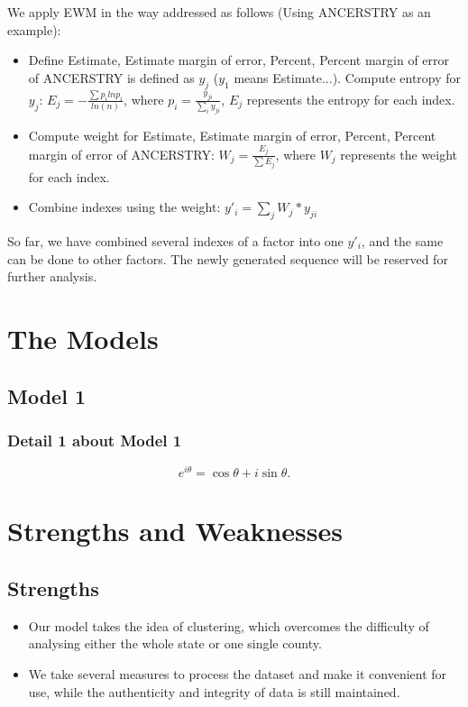 \documentclass[12pt]{article}
\begin{document}
We apply EWM in the way addressed as follows (Using ANCERSTRY as an example):
\begin{itemize}
	\item Define Estimate, Estimate margin of error, Percent, Percent margin of error of ANCERSTRY is defined as $y_{j}$ ($y_{1}$ means Estimate...). Compute entropy for $y_{j}$: $ E_{j} = -\frac{\sum p_{i}lnp_{i}}{ln(n)}$, where $p_{i}=\frac{y_{ji}}{\sum_{i} y_{ji}}$, $E_{j}$ represents the entropy for each index.
	\item Compute weight for Estimate, Estimate margin of error, Percent, Percent margin of error of ANCERSTRY: $ W_{j} = \frac{E_{j}}{\sum E_{j}}$, where $W_{j}$ represents the weight for each index.
	\item Combine indexes using the weight: $y'_{i} = \sum_{j} W_{j} * y_{ji}$
\end{itemize}
So far, we have combined several indexes of a factor into one $y'_{i}$, and the same can be done to other factors. The newly generated sequence will be reserved for further analysis.

\section{The Models}
\subsection{Model 1}
\subsubsection{Detail 1 about Model 1}
\begin{equation}
    e^{i\theta}=\cos\theta+i\sin\theta.
\end{equation}

\section{Strengths and Weaknesses}
\subsection{Strengths}
\begin{itemize}
    \item Our model takes the idea of clustering, which overcomes the difficulty of analysing either the whole state or one single county.
    \item We take several measures to process the dataset and make it convenient for use, while the authenticity and integrity of data is still maintained.
\end{itemize}
\end{document}
